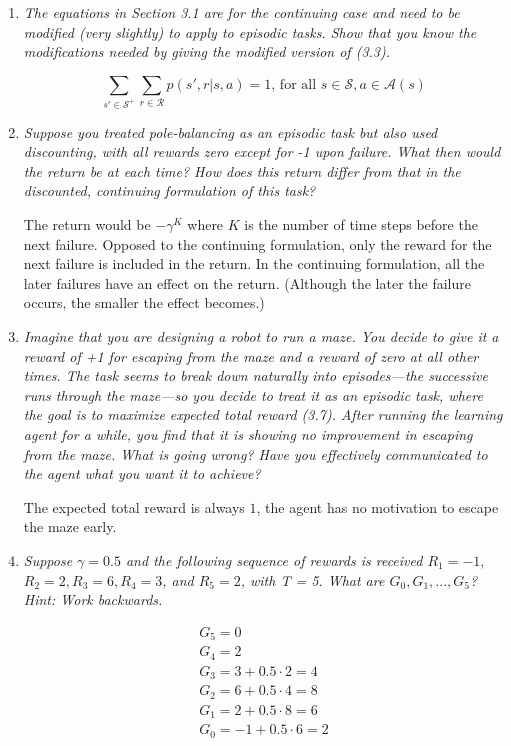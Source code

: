 \documentclass[12pt,a4paper]{article}
\begin{document}
\begin{enumerate}
  \item
    \textit{The equations in Section 3.1 are for the continuing case and need to be
    modified (very slightly) to apply to episodic tasks. Show that you know the modifications
    needed by giving the modified version of (3.3).}

    \[
    \sum\limits_{s' \in \mathcal{S}^+} \sum\limits_{r \in \mathcal{R}} p(s', r | s, a) = 1 \text{, for all }
    s \in \mathcal{S}, a \in \mathcal{A}(s)
    \]

  \item
    \textit{Suppose you treated pole-balancing as an episodic task but also used
    discounting, with all rewards zero except for -1 upon failure. What then would the
    return be at each time? How does this return differ from that in the discounted, continuing
    formulation of this task?}

  The return would be $-\gamma^K$ where $K$ is the number of time steps before the next failure.
  Opposed to the continuing formulation, only the reward for the next failure is included
  in the return. In the continuing formulation, all the later failures have an effect on the
  return. (Although the later the failure occurs, the smaller the effect becomes.)

\item
  \textit{Imagine that you are designing a robot to run a maze. You decide to give it a
  reward of +1 for escaping from the maze and a reward of zero at all other times. The task
  seems to break down naturally into episodes—the successive runs through the maze—so
  you decide to treat it as an episodic task, where the goal is to maximize expected total
  reward (3.7). After running the learning agent for a while, you find that it is showing
  no improvement in escaping from the maze. What is going wrong? Have you effectively
  communicated to the agent what you want it to achieve?}

  The expected total reward is always $1$, the agent has no motivation to escape the maze
  early.

\item
  \textit{Suppose $\gamma = 0.5$ and the following sequence of rewards is received $R_1 = -1,$\\
  $R_2 = 2, R_3 = 6, R_4 = 3$, and $R_5 = 2$, with T = 5. What are $G_0, G_1, ..., G_5$? Hint:
  Work backwards.}

  \begin{align*}
    G_5 = 0\\
    G_4 = 2\\
    G_3 = 3 + 0.5 \cdot 2 = 4\\
    G_2 = 6 + 0.5 \cdot 4 = 8\\
    G_1 = 2 + 0.5 \cdot 8 = 6\\
    G_0 = -1 + 0.5 \cdot 6 = 2
  \end{align*}


\end{enumerate}
\end{document}
